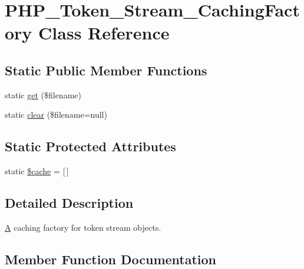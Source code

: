 \hypertarget{class_p_h_p___token___stream___caching_factory}{}\section{P\+H\+P\+\_\+\+Token\+\_\+\+Stream\+\_\+\+Caching\+Factory Class Reference}
\label{class_p_h_p___token___stream___caching_factory}
\subsection*{Static Public Member Functions}
\begin{DoxyCompactItemize}
\item 
static \mbox{\hyperlink{class_p_h_p___token___stream___caching_factory_aa78a0849b46f1c484990d5f8809da83d}{get}} (\$filename)
\item 
static \mbox{\hyperlink{class_p_h_p___token___stream___caching_factory_a61d10a417f42e8d65795abe464940d2c}{clear}} (\$filename=null)
\end{DoxyCompactItemize}
\subsection*{Static Protected Attributes}
\begin{DoxyCompactItemize}
\item 
static \mbox{\hyperlink{class_p_h_p___token___stream___caching_factory_ac2dc76d756ec398393d4b1d23659276c}{\$cache}} = \mbox{[}$\,$\mbox{]}
\end{DoxyCompactItemize}


\subsection{Detailed Description}
\mbox{\hyperlink{class_a}{A}} caching factory for token stream objects. 

\subsection{Member Function Documentation}
\mbox{\label{class_p_h_p___token___stream___caching_factory_a61d10a417f42e8d65795abe464940d2c}} 
